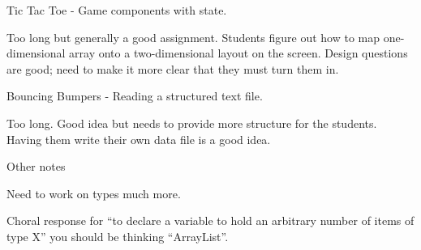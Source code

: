 \documentclass[10pt,oneside]{memoir}
\newcounter{LabPhase}
\newenvironment{LabExercises}{%
\renewcommand{\ExerciseListName}{Question}%
\renewcommand{\ExerciseListHeader}{\textbf{%
   Lab\ExerciseHeaderNB. }}
\begin{ExerciseList}}%
{\end{ExerciseList}}
\newcommand{\Lab}{\Exercise[name={Lab Phase\ExerciseHeaderNB},counter={LabPhase}]}
\begin{document}
\begin{LabExercises}
\Lab Tic Tac Toe - Game components with state. 

  Too long but generally a good assignment. Students figure out how to
  map one-dimensional array onto a two-dimensional layout on the
  screen. Design questions are good; need to make it more clear that
  they must turn them in.

\Lab Bouncing Bumpers - Reading a structured text file.

  Too long. Good idea but needs to provide more structure for the
  students. Having them write their own data file is a good idea.

\end{LabExercises}

\large{Other notes}

Need to work on types much more. 

Choral response for ``to declare a variable to hold an arbitrary
number of items of type X'' you should be thinking ``ArrayList''.
\end{document}
